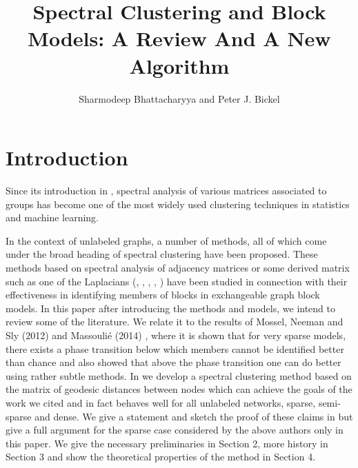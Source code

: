 \documentclass[graybox]{svmult}
\begin{document}
\title*{Spectral Clustering and Block Models: A Review And A New Algorithm}
\author{Sharmodeep Bhattacharyya and Peter J. Bickel}
\maketitle






\section{Introduction}
\label{intro}


Since its introduction in \cite{MR0318007}, spectral analysis of various matrices associated to groups has become one of the most widely used clustering techniques in statistics and machine learning.

In the context of unlabeled graphs, a number of methods, all of which come under the broad heading of spectral clustering have been proposed. These methods based on spectral analysis of adjacency matrices or some derived matrix such as one of the Laplacians (\cite{shi2000normalized}, \cite{ng2002spectral}, \cite{MR2396807}, \cite{MR2893856}, \cite{MR3010899}) have been studied in connection with their effectiveness in identifying members of blocks in exchangeable graph block models. In this paper after introducing the methods and models, we intend to review some of the literature. We relate it to the results of Mossel, Neeman and Sly (2012) \cite{mossel2012stochastic} and Massouli\'{e} (2014) \cite{massoulie2014community}, where it is shown that for very sparse models, there exists a phase transition below which members cannot be identified better than chance and also showed that above the phase transition one can do better using rather subtle methods. In \cite{bhattacharyya2014community} we develop a spectral clustering method based on the matrix of geodesic distances between nodes which can achieve the goals of the work we cited and in fact behaves well for all unlabeled networks, sparse, semi-sparse and dense. We give a statement and sketch the proof of these claims in \cite{} but give a full argument for the sparse case considered by the above authors only in this paper. We give the necessary preliminaries in Section 2, more history in Section 3 and show the theoretical properties of the method in Section 4.
\end{document}
